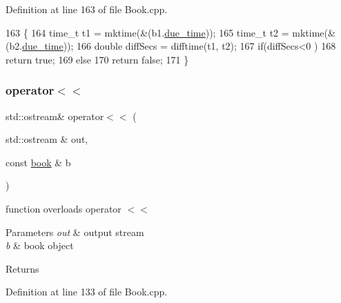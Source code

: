Definition at line 163 of file Book.\+cpp.


\begin{DoxyCode}
163                                       \{
164     time\_t t1 = mktime(&(b1.\hyperlink{classbook_abf72d9a32cdadee632df5a626dbe33b8}{due\_time}));
165     time\_t t2 = mktime(&(b2.\hyperlink{classbook_abf72d9a32cdadee632df5a626dbe33b8}{due\_time}));
166     \textcolor{keywordtype}{double} diffSecs = difftime(t1, t2);
167     \textcolor{keywordflow}{if}(diffSecs<0 )
168         \textcolor{keywordflow}{return} \textcolor{keyword}{true};
169     \textcolor{keywordflow}{else}
170         \textcolor{keywordflow}{return} \textcolor{keyword}{false};
171 \}
\end{DoxyCode}
\mbox{\label{classbook_a9bd0243ea50c5b8c37ed0d5527f24177}} 
\subsubsection{\texorpdfstring{operator$<$$<$}{operator<<}}
{\footnotesize\ttfamily std\+::ostream\& operator$<$$<$ (\begin{DoxyParamCaption}\item[{std\+::ostream \&}]{out,  }\item[{const \hyperlink{classbook}{book} \&}]{b }\end{DoxyParamCaption})\hspace{0.3cm}{\ttfamily [friend]}}

function overloads operator $<$$<$ 
\begin{DoxyParams}{Parameters}
{\em out} & output stream \\
\hline
{\em b} & book object \\
\hline
\end{DoxyParams}
\begin{DoxyReturn}{Returns}

\end{DoxyReturn}


Definition at line 133 of file Book.\+cpp.


